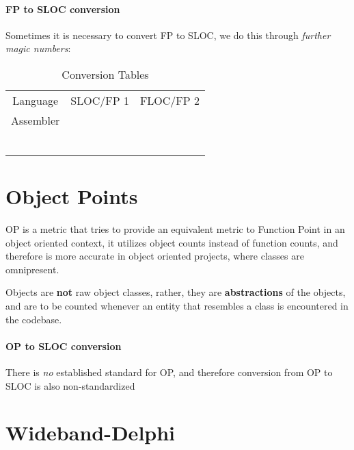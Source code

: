 \documentclass[openright, twoside, twocolumn]{report}
\begin{document}
\paragraph{FP to SLOC conversion}

Sometimes it is necessary to convert FP to SLOC, we do this through \emph{further magic numbers}:

\begin{table}[h!]
  \centering
  \begin{tabular}{c c c}
      \rowcolor{gray!50}
      Language & SLOC/FP 1 &  FLOC/FP 2 \\
      Assembler &  &   \\
       &  &   \\
       &  &   \\
       &  &   \\
       &  &   \\
       &  &   \\
       &  & \\
  \end{tabular}
  \caption{Conversion Tables}
  \label{tab:langs}
\end{table} %

\section{Object Points}

OP is a metric that tries to provide an equivalent metric to Function Point in an object oriented context,
it utilizes object counts instead of function counts, and therefore is more accurate in object oriented projects,
where classes are omnipresent.

Objects are \textbf{not} raw object classes, rather, they are \textbf{abstractions} of the objects,
and are to be counted whenever an entity that resembles a class is encountered in the codebase.

\paragraph{OP to SLOC conversion}
There is \emph{no} established standard for OP, and therefore conversion from OP to SLOC is also
non-standardized

\section{Wideband-Delphi}
\end{document}
